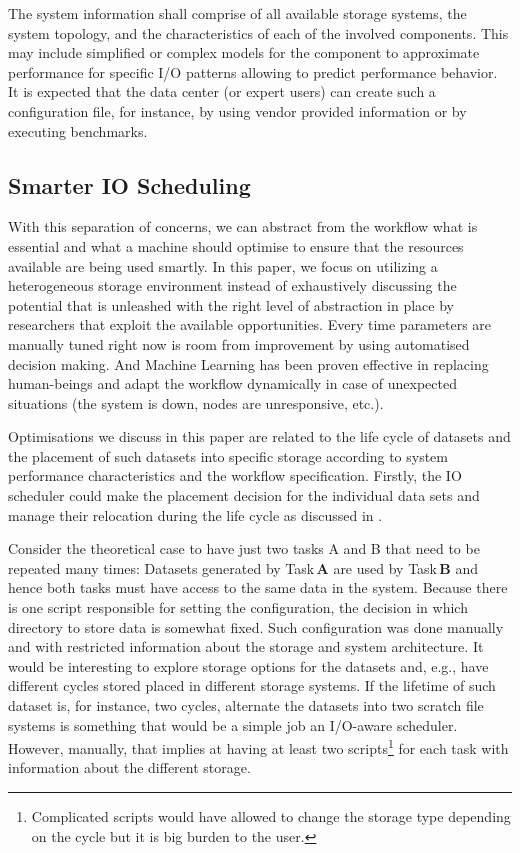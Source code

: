 \documentclass[a4paper]{article}
\begin{document}
The system information shall comprise of all available storage systems, the system topology, and the characteristics of each of the involved components.
This may include simplified or complex models for the component to approximate performance for specific I/O patterns allowing to predict performance behavior.
It is expected that the data center (or expert users) can create such a configuration file, for instance, by using vendor provided information or by executing benchmarks.

\subsection{Smarter IO Scheduling}

With this separation of concerns, we can abstract from the workflow what is essential and what a machine should optimise to ensure that the resources available are being used smartly.
In this paper, we focus on utilizing a heterogeneous storage environment instead of exhaustively discussing the potential that is unleashed with the right level of abstraction in place by researchers that exploit the available opportunities.
Every time parameters are manually tuned right now is room from improvement by using automatised decision making.
And Machine Learning has been proven effective in replacing human-beings and adapt the workflow dynamically in case of unexpected situations (the system is down, nodes are unresponsive, etc.).

Optimisations we discuss in this paper are related to the life cycle of datasets and the placement of such datasets into specific storage according to system performance characteristics and the workflow specification.
Firstly, the IO scheduler could make the placement decision for the individual data sets and manage their relocation during the life cycle as discussed in .

Consider the theoretical case to have just two tasks A and B that need to be repeated many times:
Datasets generated by Task\,\textbf{A} are used by Task\,\textbf{B} and hence both tasks must have access to the same data in the system.
Because there is one script responsible for setting the configuration, the decision in which directory to store data is somewhat fixed.
Such configuration was done manually and with restricted information about the storage and system architecture.
It would be interesting to explore storage options for the datasets and, e.g., have different cycles stored placed in different storage systems.
If the lifetime of such dataset is, for instance, two cycles, alternate the datasets into two scratch file systems is something that would be a simple job an I/O-aware scheduler.
However, manually, that implies at having at least two scripts\footnote{Complicated scripts would have allowed to change the storage type depending on the cycle but it is big burden to the user.} for each task with information about the different storage.
\end{document}
